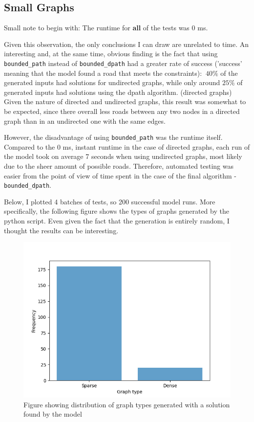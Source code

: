 \documentclass{article}
\begin{document}
\subsection{Small Graphs}
Small note to begin with: The runtime for \textbf{all} of the tests was 0 ms. 

Given this observation, the only conclusions I can
draw are unrelated to time. An interesting and, at the same time, obvious finding is the fact that using \texttt{bounded\_path} 
instead of \texttt{bounded\_dpath} had a greater rate of success ('success' meaning that the model found a road that meets the constraints): 
$~40\%$ of the generated inputs had solutions for undirected graphs, while only around $25\%$ of generated inputs had solutions using the 
dpath algorithm. (directed graphs) Given the nature of directed and undirected graphs, this result was somewhat to be expected, since there 
overall less roads between any two nodes in a directed graph than in an undirected one with the same edges. 

However, the disadvantage of using \texttt{bounded\_path} was the runtime itself. Compared to the 0 ms, instant runtime in the case of directed 
graphs, each run of the model took on average 7 seconds when using undirected graphs, most likely due to the sheer amount of possible roads. 
Therefore, automated testing was easier from the point of view of time spent in the case of the final algorithm - \texttt{bounded\_dpath}.

Below, I plotted 4 batches of tests, so 200 successful model runs. More specifically, the following figure shows the types of 
graphs generated by the python script. Even given the fact that the generation is entirely random, I thought the results can be interesting.

\begin{figure}[h]
    \centering 
    \includegraphics[width=0.8\linewidth]{../images/figure1.png}
    \caption{Figure showing distribution of graph types generated with a solution found by the model}
\end{figure}
\end{document}

